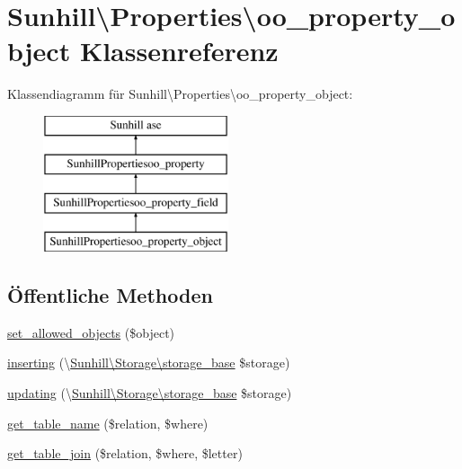 \hypertarget{classSunhill_1_1Properties_1_1oo__property__object}{}\section{Sunhill\textbackslash{}Properties\textbackslash{}oo\+\_\+property\+\_\+object Klassenreferenz}
\label{classSunhill_1_1Properties_1_1oo__property__object}
Klassendiagramm für Sunhill\textbackslash{}Properties\textbackslash{}oo\+\_\+property\+\_\+object\+:\begin{figure}[H]
\begin{center}
\leavevmode
\includegraphics[height=4.000000cm]{dc/dbe/classSunhill_1_1Properties_1_1oo__property__object}
\end{center}
\end{figure}
\subsection*{Öffentliche Methoden}
\begin{DoxyCompactItemize}
\item 
\hyperlink{classSunhill_1_1Properties_1_1oo__property__object_a51ac664736a189f17a2a3f5cf6e45a9c}{set\+\_\+allowed\+\_\+objects} (\$object)
\item 
\hyperlink{classSunhill_1_1Properties_1_1oo__property__object_a532528645afde597a596b72643f8e162}{inserting} (\textbackslash{}\hyperlink{classSunhill_1_1Storage_1_1storage__base}{Sunhill\textbackslash{}\+Storage\textbackslash{}storage\+\_\+base} \$storage)
\item 
\hyperlink{classSunhill_1_1Properties_1_1oo__property__object_a887fe0010ff44c8f27825da3f37e24cd}{updating} (\textbackslash{}\hyperlink{classSunhill_1_1Storage_1_1storage__base}{Sunhill\textbackslash{}\+Storage\textbackslash{}storage\+\_\+base} \$storage)
\item 
\hyperlink{classSunhill_1_1Properties_1_1oo__property__object_aba0d8408fd13cd41bb9a41d4fe52771d}{get\+\_\+table\+\_\+name} (\$relation, \$where)
\item 
\hyperlink{classSunhill_1_1Properties_1_1oo__property__object_ad3c64ad15e39896be5d76f8386dfe64a}{get\+\_\+table\+\_\+join} (\$relation, \$where, \$letter)
\end{DoxyCompactItemize}
